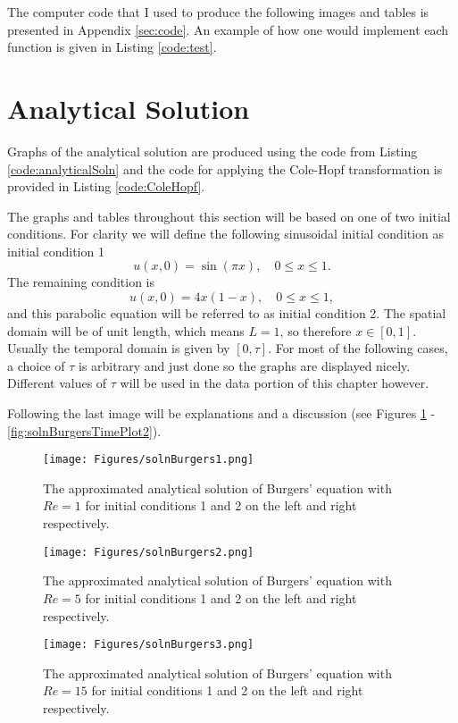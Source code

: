 \documentclass[undefended]{sfuthesis}
\begin{document}
The computer code that I used to produce the following images and tables is presented in Appendix \ref{sec:code}. An example of how one would implement each function is given in Listing \ref{code:test}.

\section{Analytical Solution}

Graphs of the analytical solution are produced using the code from Listing \ref{code:analyticalSoln} and the code for applying the Cole-Hopf transformation is provided in Listing \ref{code:ColeHopf}. 

The graphs and tables throughout this section will be based on one of two initial conditions. For clarity we will define the following sinusoidal initial condition as initial condition 1 \[u(x, 0) = \sin (\pi x), \quad 0 \leq x \leq 1.\] The remaining condition is \[u(x, 0) = 4x(1 - x), \quad 0 \leq x \leq 1,\] and this parabolic equation will be referred to as initial condition 2. The spatial domain will be of unit length, which means $L = 1$, so therefore $x \in [0, 1]$. Usually the temporal domain is given by $[0, \tau]$. For most of the following cases, a choice of $\tau$ is arbitrary and just done so the graphs are displayed nicely. Different values of $\tau$ will be used in the data portion of this chapter however.

Following the last image will be explanations and a discussion (see Figures \ref{fig:solnBurgers1} - \ref{fig:solnBurgersTimePlot2}).

\begin{figure}[h!]
	\centering
	\texttt{[image: Figures/solnBurgers1.png]}
	\caption{The approximated analytical solution of Burgers' equation with $Re = 1$ for initial conditions 1 and 2 on the left and right respectively.}
	\label{fig:solnBurgers1}
\end{figure}

\begin{figure}[h!]
	\centering
	\texttt{[image: Figures/solnBurgers2.png]}
	\caption{The approximated analytical solution of Burgers' equation with $Re = 5$ for initial conditions 1 and 2 on the left and right respectively.}
	\label{fig:solnBurgers2}
\end{figure}

\begin{figure}[h!]
	\centering
	\texttt{[image: Figures/solnBurgers3.png]}
	\caption{The approximated analytical solution of Burgers' equation with $Re = 15$ for initial conditions 1 and 2 on the left and right respectively.}
	\label{fig:solnBurgers3}
\end{figure}
\end{document}
